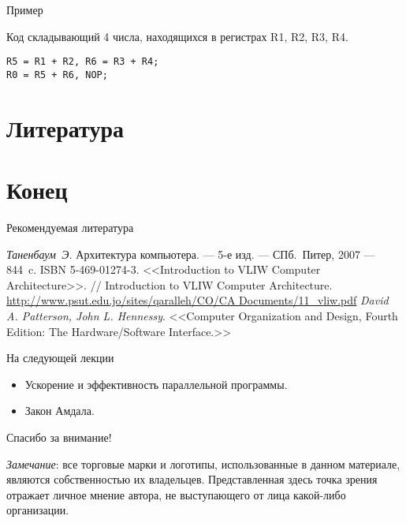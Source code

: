 \begin{frame}[fragile]{Пример}

Код складывающий 4 числа, находящихся в регистрах R1, R2, R3, R4.

\begin{lstlisting}
R5 = R1 + R2, R6 = R3 + R4;
R0 = R5 + R6, NOP;
\end{lstlisting}

\end{frame}

\section*{Литература}

\section*{Конец}

\begin{frame}[allowframebreaks]{Рекомендуемая литература}
\begin{thebibliography}{99}
    \bibitem{} \textit{Таненбаум~Э.} Архитектура компьютера. --- 5-е изд. ---
        СПб.~Питер, 2007 --- 844~c. ISBN 5-469-01274-3.
     <<Introduction to VLIW Computer Architecture>>. // Introduction to VLIW Computer Architecture. \url{http://www.psut.edu.jo/sites/qaralleh/CO/CA Documents/11_vliw.pdf}
     \textit{David A. Patterson, John L. Hennessy}. <<Computer Organization and Design, Fourth Edition: The Hardware/Software Interface.>>
\end{thebibliography}
\end{frame}

\begin{frame}{На следующей лекции}
\begin{itemize}
    \item Ускорение и эффективность параллельной программы.
    \item Закон Амдала.
\end{itemize}
\end{frame}

\begin{frame}

{\huge{Спасибо за внимание!}\par}

\vfill

\tiny{\textit{Замечание}: все торговые марки и логотипы, использованные в данном материале, являются собственностью их владельцев. Представленная здесь точка зрения отражает личное мнение автора, не выступающего от лица какой-либо организации.}

\end{frame}


